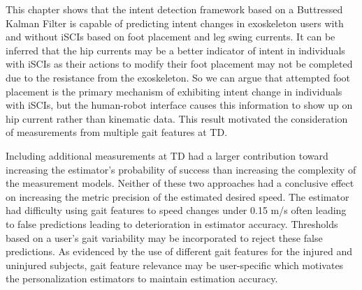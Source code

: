 This chapter shows that the intent detection framework based on a Buttressed Kalman Filter is capable of predicting intent changes in exoskeleton users with and without iSCIs based on foot placement and leg swing currents. It can be inferred that the hip currents may be a better indicator of intent in individuals with iSCIs as their actions to modify their foot placement may not be completed due to the resistance from the exoskeleton. So we can argue that attempted foot placement is the primary mechanism of exhibiting intent change in individuals with iSCIs, but the human-robot interface causes this information to show up on hip current rather than kinematic data. This result motivated the consideration of measurements from multiple gait features at TD.

Including additional measurements at TD had a larger contribution toward increasing the estimator's probability of success than increasing the complexity of the measurement models. Neither of these two approaches had a conclusive effect on increasing the metric precision of the estimated desired speed. The estimator had difficulty using gait features to speed changes under 0.15 m/s often leading to false predictions leading to deterioration in estimator accuracy. Thresholds based on a user's gait variability may be incorporated to reject these false predictions. As evidenced by the use of different gait features for the injured and uninjured subjects, gait feature relevance may be user-specific which motivates the personalization estimators to maintain estimation accuracy.